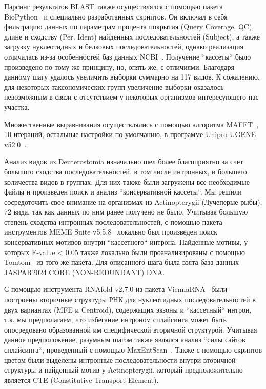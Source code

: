 Парсинг результатов BLAST также осуществлялся с помощью пакета BioPython~\cite{biopython} и специально разработанных скриптов.
Он включал в себя фильтрацию данных по параметрам процента покрытия (Query Coverage, QC), длине и сходству (Per. Ident) найденных последовательностей (Subject), а также загрузку нуклеотидных и белковых последовательностей, однако реализация отличалась из-за особенностей баз данных NCBI~\cite{ncbi_general}.
Получение ``кассеты`` было произведено по тому же принципу, но, опять же, с отличиями.
Благодаря данному шагу удалось увеличить выборки суммарно на 117 видов.
К сожалению, для некоторых таксономических групп увеличение выборки оказалось невозможным в связи с отсутствием у некоторых организмов интересующего нас участка.

Множественные выравнивания осуществлялись с помощью алгоритма MAFFT~\cite{mafft}, 10 итераций, остальные настройки по-умолчанию, в программе Unipro UGENE v52.0~\cite{ugene}.

Анализ видов из Deuterostomia изначально шел более благоприятно за счет большого сходства последовательностей, в том числе интронных, и большего количества видов в группах.
Для них также были загружены все необходимые файлы и произведен поиск и анализ ``консервативной кассеты``.
Мы решили сосредоточить свое внимание на организмах из Actinopterygii (Лучеперые рыбы), 72 вида, так как данных по ним ранее получено не было.
Учитывая большую степень сходства интронных последовательностей, с помощью пакета инструментов MEME Suite v5.5.8~\cite{meme} локально был произведен поиск консервативных мотивов внутри ``кассетного`` интрона.
Найденные мотивы, у которых E-value < 0.05 также локально были проанализированы с помощью Tomtom~\cite{tomtom} из того же пакета.
Для описанного шага была взята база данных JASPAR2024 CORE (NON-REDUNDANT) DNA.

С помощью инструмента RNAfold v2.7.0 из пакета Vienna\-RNA~\cite{viennarna} были построены вторичные структуры РНК для нуклеотидных последовательностей в двух вариантах (MFE и Centroid), содержащих экзоны и ``кассетный`` интрон, т.к. мы предполагаем, что избегание интроном сплайсинга может быть опосредовано образованной им специфической вторичной структурой.
Учитывая данное предположение, разумным шагом также являлся анализ ``силы сайтов сплайсинга``, проведенный с помощью MaxEntScan~\cite{maxentsccan}.
Также с помощью скриптов цветом были выделены интронные последовательности внутри вторичной структуры и найденный мотив у Actinopterygii, который предположительно является CTE (Constitutive Transport Element).

